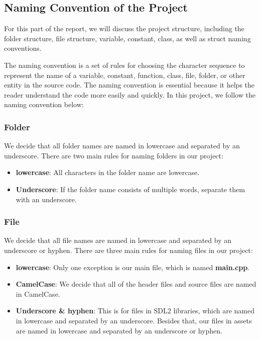 \subsection{Naming Convention of the Project}
\label{subsec:naming-convention-of the-project}

\hspace{1cm} For this part of the report, we will discuss the project structure, including the folder structure, file structure, variable, constant, class, as well as struct naming conventions.

\vspace{0.5cm}

\hspace{1cm} The naming convention is a set of rules for choosing the character sequence to represent the name of a variable, constant, function, class, file, folder, or other entity in the source code. The naming convention is essential because it helps the reader understand the code more easily and quickly. In this project, we follow the naming convention below:

\subsubsection{Folder}
\label{subsubsec:folder}

\hspace{1cm} We decide that all folder names are named in lowercase and separated by an underscore. There are two main rules for naming folders in our project:

\begin{itemize}
    \item \textbf{lowercase}: All characters in the folder name are lowercase.
    \item \textbf{Underscore}: If the folder name consists of multiple words, separate them with an underscore.
\end{itemize}

\subsubsection{File}
\label{subsubsec:file}

\hspace{1cm} We decide that all file names are named in lowercase and separated by an underscore or hyphen. There are three main rules for naming files in our project:

\begin{itemize}
    \item \textbf{lowercase}: Only one exception is our main file, which is named \textbf{main.cpp}.
    \item \textbf{CamelCase}: We decide that all of the header files and source files are named in CamelCase.
    \item \textbf{Underscore \& hyphen}: This is for files in SDL2 libraries, which are named in lowercase and separated by an underscore. Besides that, our files in assets are named in lowercase and separated by an underscore or hyphen.
\end{itemize}

